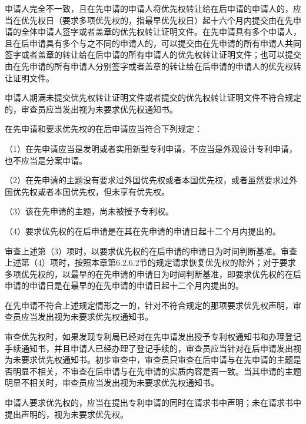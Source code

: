 申请人完全不一致，且在先申请的申请人将优先权转让给在后申请的申请人的，应当在优先权日（要求多项优先权的，指最早优先权日）起十六个月内提交由在先申请的全体申请人签字或者盖章的优先权转让证明文件。在先申请具有多个申请人，且在后申请具有多个与之不同的申请人的，可以提交由在先申请的所有申请人共同签字或者盖章的转让给在后申请的所有申请人的优先权转让证明文件；也可以提交由在先申请的所有申请人分别签字或者盖章的转让给在后申请的申请人的优先权转让证明文件。

申请人期满未提交优先权转让证明文件或者提交的优先权转让证明文件不符合规定的，审查员应当发出视为未要求优先权通知书。

在先申请和要求优先权的在后申请应当符合下列规定：

{\setlength{\parindent}{17.1bp}（1）在先申请应当是发明或者实用新型专利申请，不应当是外观设计专利申请，也不应当是分案申请。\par}

{\setlength{\parindent}{17.1bp}（2）在先申请的主题没有要求过外国优先权或者本国优先权，或者虽然要求过外国优先权或者本国优先权，但未享有优先权。\par}

{\setlength{\parindent}{17.1bp}（3）该在先申请的主题，尚未被授予专利权。\par}

{\setlength{\parindent}{17.1bp}（4）要求优先权的在后申请是在其在先申请的申请日起十二个月内提出的。\par}

审查上述第（3）项时，以要求优先权的在后申请的申请日为时间判断基准。审查上述第（4）项时，按照本章第6.2.6.2节的规定请求恢复优先权的除外；对于要求多项优先权的，以最早的在先申请的申请日为时间判断基准，即要求优先权的在后申请的申请日是在最早的在先申请的申请日起十二个月内提出的。

在先申请不符合上述规定情形之一的，针对不符合规定的那项要求优先权声明，审查员应当发出视为未要求优先权通知书。

审查优先权时，如果发现专利局已经对在先申请发出授予专利权通知书和办理登记手续通知书，并且申请人已经办理了登记手续的，审查员应当针对在后申请发出视为未要求优先权通知书。初步审查中，审查员只审查在后申请与在先申请的主题是否明显不相关，不审查在后申请与在先申请的实质内容是否一致。当其申请的主题明显不相关时，审查员应当发出视为未要求优先权通知书。

申请人要求优先权的，应当在提出专利申请的同时在请求书中声明；未在请求书中提出声明的，视为未要求优先权。

